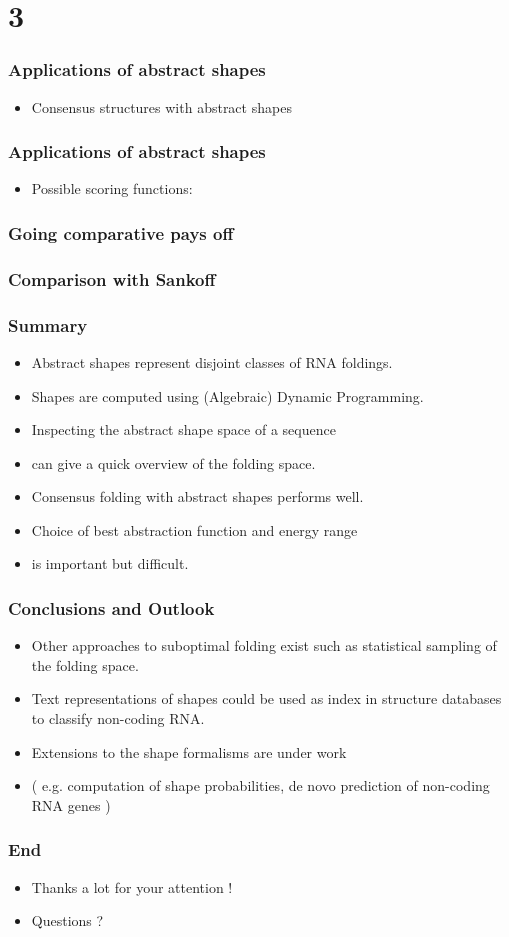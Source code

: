 \documentclass[ignorenonframetext,10pt]{beamer}
\begin{document}
\section{3}
\begin{frame}
\frametitle{Applications of abstract shapes}
   \begin{itemize} 
   \item Consensus structures with abstract shapes
   \end{itemize}
\end{frame}

\begin{frame}
\frametitle{Applications of abstract shapes}
   \begin{itemize} 
   \item Possible scoring functions:
   \end{itemize}
\end{frame}

\begin{frame}
\frametitle{Going comparative pays off}
\end{frame}

\begin{frame}
\frametitle{Comparison with Sankoff}
\end{frame}

\begin{frame}
\frametitle{Summary }
   \begin{itemize} 
   \item Abstract shapes represent disjoint classes of RNA foldings.
   \item Shapes are computed using (Algebraic) Dynamic Programming.
   \item Inspecting the abstract shape space of a sequence
   \item    can give a quick overview of the folding space.
   \item Consensus folding with abstract shapes performs well.
   \item Choice of best abstraction function and energy range 
   \item     is important but difficult.
   \end{itemize}
\end{frame}

\begin{frame}
\frametitle{Conclusions and Outlook}
   \begin{itemize} 
   \item Other approaches to suboptimal folding exist such as statistical sampling of the folding space.
   \item Text representations of shapes could be used as index in structure databases to classify non-coding RNA.
   \item Extensions to the shape formalisms are under work
   \item   ( e.g. computation of shape probabilities, de novo prediction of non-coding RNA genes )
   \end{itemize}
\end{frame}

\begin{frame}
\frametitle{End}
   \begin{itemize} 
   \item Thanks a lot for your attention !
   \item Questions ?
   \end{itemize}
\end{frame}
\end{document}
